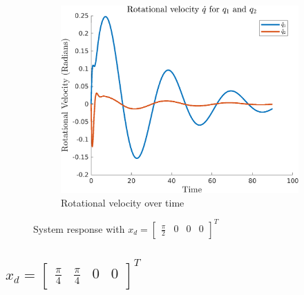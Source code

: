 \documentclass{article}
\begin{document}
\begin{figure}[H]
\begin{subfigure}{0.325\textwidth}
        \centering
        \includegraphics[width = \textwidth]{figures/rotational-velocity-b2.png}
        \caption{Rotational velocity over time}
    \end{subfigure}
    \caption{System response with $x_d=\begin{bmatrix} \frac{\pi}{2} & 0 & 0 & 0 \end{bmatrix}^T$}
    \label{fig:b-2_results}
\end{figure}

\subsection*{$x_d = \begin{bmatrix}\frac{\pi}{4} & \frac{\pi}{4} & 0 & 0 \end{bmatrix}^T$}
\end{document}
